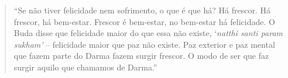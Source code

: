 

\cleartoverso

\begin{quote}
“Se não tiver felicidade nem sofrimento, o que é que há? Há frescor. Há
frescor, há bem-estar. Frescor é bem-estar, no bem-estar há felicidade.
O Buda disse que felicidade maior do que essa não existe,
‘\textit{natthi santi param sukham’} – felicidade maior que
paz não existe. Paz exterior e paz mental que fazem parte do Darma
fazem surgir frescor. O modo de ser que faz surgir aquilo que chamamos
de Darma.”
\end{quote}

